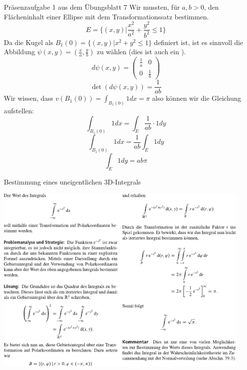\begin{Beispiel}{Präsenzaufgabe 1 aus dem Übungsblatt 7}
    Wir mussten, für $a,b>0$, den Flächeninhalt einer Ellipse mit dem Transformationssatz bestimmen.
    $$E=\{(x,y)| \frac{x^2}{a^2}+\frac{y^2}{b^2} \leq 1\}$$
    Da die Kugel als $B_1(0)=\{(x,y)| x^2+y^2 \leq 1\}$ definiert ist, ist es sinnvoll die Abbildung $\psi(x,y)=(\frac{x}{a}, \frac{y}{b})$ zu wählen (dies ist auch ein ).
    $$d\psi(x,y)=\begin{pmatrix}
        \frac{1}{a} & 0 \\
        0 & \frac{1}{b}
    \end{pmatrix}$$
    $$\det(d\psi(x,y))=\frac{1}{ab}$$
    Wir wissen, dass $v(B_1(0))=\int_{B_1(0)} 1dx = \pi$ also können wir die Gleichung aufstellen:
    $$\int_{B_1(0)}1 dx = \int_E \frac{1}{ab}\cdot 1 dy$$
    $$\int_{B_1(0)}1 dx = \frac{1}{ab}\int_E 1 dy$$
    $$\int_E 1 dy = ab\pi$$
\end{Beispiel}
\begin{Beispiel}{Bestimmung eines uneigentlichen 3D-Integrals}
    \begin{center}
    \includegraphics[width=0.95\textwidth]{Dateien/Uneigentlich.pdf}

\end{center}
\end{Beispiel}
